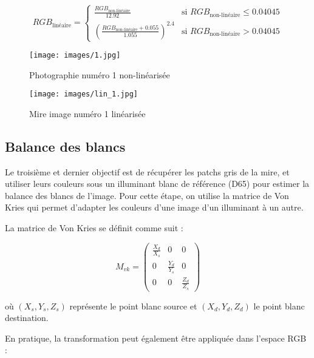 \documentclass[12pt]{article}
\begin{document}
\begin{equation}
RGB_{\text{linéaire}} = 
\begin{cases} 
\frac{RGB_{\text{non-linéaire}}}{12.92} & \text{si } RGB_{\text{non-linéaire}} \leq 0.04045 \\ 
\left(\frac{RGB_{\text{non-linéaire}} + 0.055}{1.055}\right)^{2.4} & \text{si } RGB_{\text{non-linéaire}} > 0.04045
\end{cases}
\end{equation}

\begin{figure}[H]
    \centering
    \begin{minipage}{0.48\textwidth}
        \centering
        \texttt{[image: images/1.jpg]}
        \caption{Photographie numéro 1 non-linéarisée}
    \end{minipage}
    \hfill
    \begin{minipage}{0.48\textwidth}
        \centering
        \texttt{[image: images/lin\_1.jpg]}
        \caption{Mire image numéro 1 linéarisée}
    \end{minipage}
\end{figure}

\subsection{Balance des blancs}

Le troisième et dernier objectif est de récupérer les patchs gris de la mire, et utiliser leurs couleurs sous un illuminant blanc de référence (D65) pour estimer la balance des blancs de l'image.
Pour cette étape, on utilise la matrice de Von Kries qui permet d'adapter les couleurs d'une image d'un illuminant à un autre.

La matrice de Von Kries se définit comme suit :

\begin{equation}
M_{vk} = 
\begin{pmatrix}
\frac{X_{d}}{X_{s}} & 0 & 0 \\
0 & \frac{Y_{d}}{Y_{s}} & 0 \\
0 & 0 & \frac{Z_{d}}{Z_{s}}
\end{pmatrix}
\end{equation}

où $(X_s, Y_s, Z_s)$ représente le point blanc source et $(X_d, Y_d, Z_d)$ le point blanc destination. 

En pratique, la transformation peut également être appliquée dans l'espace RGB :
\end{document}
